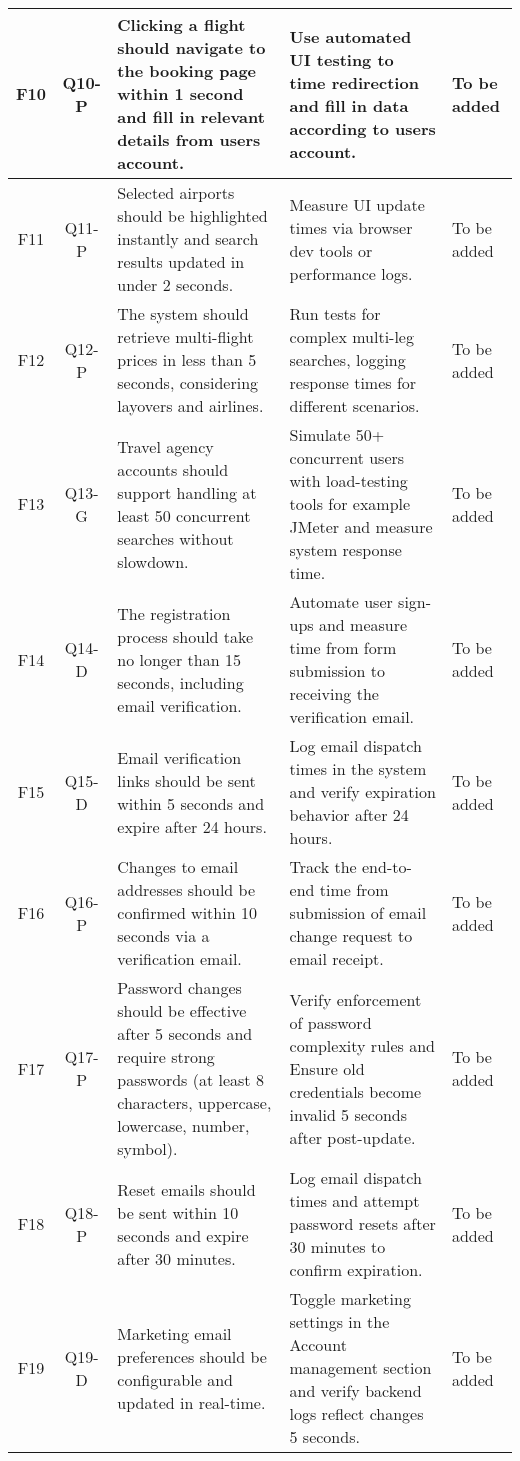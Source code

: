 \begin{longtable}{|c|c|p{4.5cm}|p{3.5cm}|p{3.5cm}|}
    \hline
    F10 & Q10-P & Clicking a flight should navigate to the booking page within 1 second and fill in relevant details from users account. & Use automated UI testing to time redirection and fill in data according to users account. & To be added \\
    \hline
    F11 & Q11-P & Selected airports should be highlighted instantly and search results updated in under 2 seconds. & Measure UI update times via browser dev tools or performance logs. & To be added \\
    \hline
    F12 & Q12-P & The system should retrieve multi-flight prices in less than 5 seconds, considering layovers and airlines. & Run tests for complex multi-leg searches, logging response times for different scenarios. & To be added \\
    \hline
    F13 & Q13-G & Travel agency accounts should support handling at least 50 concurrent searches without slowdown. & Simulate 50+ concurrent users with load-testing tools for example JMeter and measure system response time. & To be added \\
    \hline
    F14 & Q14-D & The registration process should take no longer than 15 seconds, including email verification. & Automate user sign-ups and measure time from form submission to receiving the verification email. & To be added \\
    \hline
    F15 & Q15-D & Email verification links should be sent within 5 seconds and expire after 24 hours. & Log email dispatch times in the system and verify expiration behavior after 24 hours. & To be added \\
    \hline
    F16 & Q16-P & Changes to email addresses should be confirmed within 10 seconds via a verification email. & Track the end-to-end time from submission of email change request to email receipt. & To be added \\
    \hline
    F17 & Q17-P & Password changes should be effective after 5 seconds and require strong passwords (at least 8 characters, uppercase, lowercase, number, symbol). & Verify enforcement of password complexity rules and Ensure old credentials become invalid 5 seconds after post-update. & To be added \\
    \hline
    F18 & Q18-P & Reset emails should be sent within 10 seconds and expire after 30 minutes. & Log email dispatch times and attempt password resets after 30 minutes to confirm expiration. & To be added \\
    \hline
    F19 & Q19-D & Marketing email preferences should be configurable and updated in real-time. & Toggle marketing settings in the Account management section and verify backend logs reflect changes 5 seconds. & To be added \\

\end{longtable}
